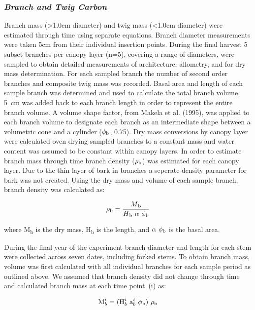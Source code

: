\documentclass[a4paper]{article}
\begin{document}
\subsubsection*{\textit{Branch and Twig Carbon}}

Branch mass (>1.0cm diameter) and twig mass (<1.0cm diameter) were estimated through time using separate equations. Branch diameter measurements were taken 5cm from their individual insertion points. During the final harvest 5 subset branches per canopy layer (n=5), covering a range of diameters, were sampled to obtain detailed measurements of architecture, allometry, and for dry mass determination. For each sampled branch the number of second order branches and composite twig mass was recorded. Basal area and length of each sample branch was determined and used to calculate the total branch volume. 5~cm was added back to each branch length in order to represent the entire branch volume. A volume shape factor, from Makela et al. (1995), was applied to each branch volume to designate each branch as an intermediate shape between a volumetric cone and a cylinder ($\phi\textsubscript{b}$, 0.75). Dry mass conversions by canopy layer were calculated oven drying sampled branches to a constant mass and water content was assumed to be constant within canopy layers. In order to estimate branch mass through time branch density ($\rho\textsubscript{b}$) was estimated for each canopy layer.  Due to the thin layer of bark in branches a seperate density parameter for bark was not created. Using the dry mass and volume of each sample branch, branch density was calculated as:

\begin{equation} \rho\textsubscript{b} = \frac{M\textsubscript{b}}{H\textsubscript{b}~\alpha~\phi\textsubscript{b}}
\label{eq:density}
\end{equation}

where M\textsubscript{b} is the dry mass, H\textsubscript{b} is the length, and $\alpha~\phi\textsubscript{b}$ is the basal area.

During the final year of the experiment branch diameter and length for each stem were collected across seven dates, including forked stems.  To obtain branch mass, volume was first calculated with all individual branches for each sample period as outlined above.  We assumed that branch density did not change through time and calculated branch mass at each time point~(i) as:

\begin{equation}  \text{M}^i_{b} = (\text{H}^i_{b}~\text{a}^i_{b}~\phi\textsubscript{b})~\rho\textsubscript{b}
\label{eq:branchmass}
\end{equation}
\end{document}
